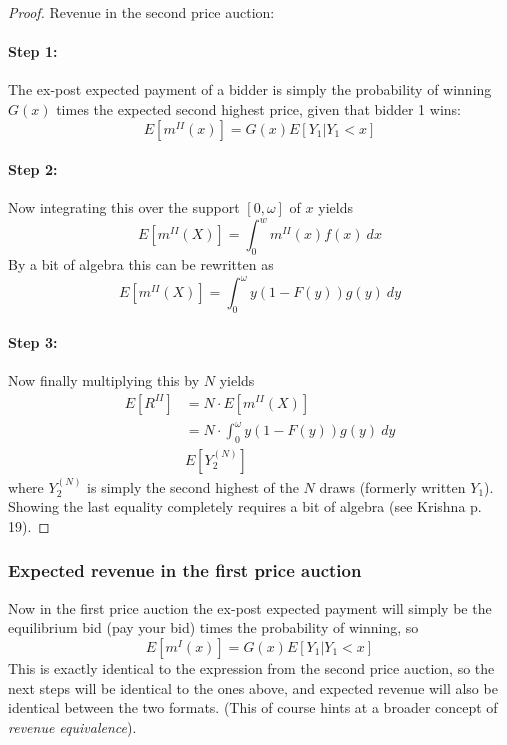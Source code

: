 \begin{proof}{Revenue in the second price auction:}
\paragraph{Step 1:} The ex-post expected payment of a bidder is simply the probability of winning $G(x)$ times the expected second highest price, given that bidder 1 wins:
\begin{equation}
  E[m^{II}(x)] = G(x)E[Y_1|Y_1 < x]
\end{equation}
\paragraph{Step 2:} Now integrating this over the support $[0, \omega]$ of $x$ yields
\begin{equation}
  E[m^{II}(X)] = \int_0^w m^{II}(x)f(x) \ dx
\end{equation}
By a bit of algebra this can be rewritten as
\begin{equation}
  E[m^{II}(X)] = \int_0^\omega y(1-F(y))g(y) \ dy
\end{equation}
\paragraph{Step 3:} Now finally multiplying this by $N$ yields
\begin{equation}
  \begin{split}
    E[R^{II}] &= N \cdot E[m^{II}(X)] \\
    &= N \cdot  \int_0^\omega y(1-F(y))g(y) \ dy \\
    & E[Y_2^{(N)}]
  \end{split}
\end{equation}
where $Y_2^{(N)}$ is simply the second highest of the $N$ draws (formerly written $Y_1$). Showing the last equality completely requires a bit of algebra (see Krishna p. 19).
\end{proof}

\subsubsection{Expected revenue in the first price auction}
Now in the first price auction the ex-post expected payment will simply be the equilibrium bid (pay your bid) times the probability of winning, so
\begin{equation}
  E[m^I(x)] = G(x) E[Y_1|Y_1 < x]
\end{equation}
This is exactly identical to the expression from the second price auction, so the next steps will be identical to the ones above, and expected revenue will also be identical between the two formats. (This of course hints at a broader concept of \textit{revenue equivalence}).


